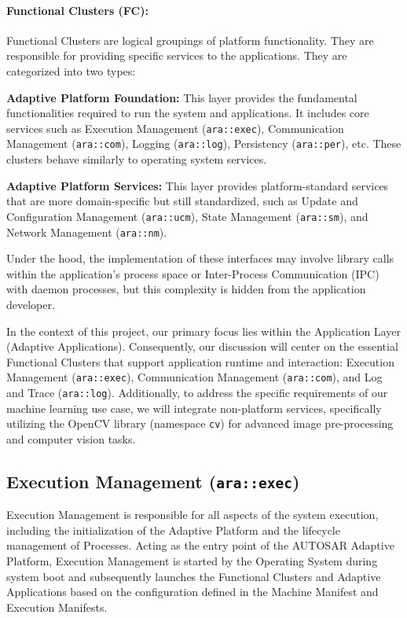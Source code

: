 \paragraph*{Functional Clusters (FC):} Functional Clusters are logical groupings of platform functionality. They are responsible for providing specific services to the applications. They are categorized into two types:

\textbf{Adaptive Platform Foundation:} This layer provides the fundamental functionalities required to run the system and applications. It includes core services such as Execution Management (\texttt{ara::exec}), Communication Management (\texttt{ara::com}), Logging (\texttt{ara::log}), Persistency (\texttt{ara::per}), etc. These clusters behave similarly to operating system services.
    
\textbf{Adaptive Platform Services:} This layer provides platform-standard services that are more domain-specific but still standardized, such as Update and Configuration Management (\texttt{ara::ucm}), State Management (\texttt{ara::sm}), and Network Management (\texttt{ara::nm}).

Under the hood, the implementation of these interfaces may involve library calls within the application's process space or Inter-Process Communication (IPC) with daemon processes, but this complexity is hidden from the application developer.



In the context of this project, our primary focus lies within the Application Layer (Adaptive Applications). Consequently, our discussion will center on the essential Functional Clusters that support application runtime and interaction: Execution Management (\texttt{ara::exec}), Communication Management (\texttt{ara::com}), and Log and Trace (\texttt{ara::log}). Additionally, to address the specific requirements of our machine learning use case, we will integrate non-platform services, specifically utilizing the OpenCV library (namespace \texttt{cv}) for advanced image pre-processing and computer vision tasks. 



\subsection{Execution Management (\texttt{ara::exec})} 

Execution Management is responsible for all aspects of the system execution, including the initialization of the Adaptive Platform and the lifecycle management of Processes. Acting as the entry point of the AUTOSAR Adaptive Platform, Execution Management is started by the Operating System during system boot and subsequently launches the Functional Clusters and Adaptive Applications based on the configuration defined in the Machine Manifest and Execution Manifests.

